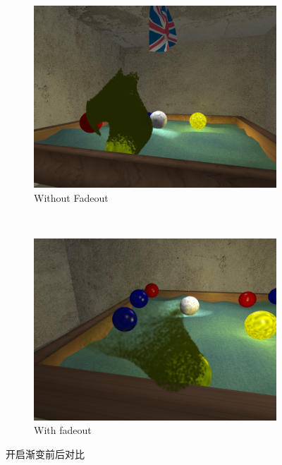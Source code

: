 \documentclass[11pt]{article}
\begin{document}
\begin{figure}[h]
\centering

\begin{subfigure}[b]{0.4\textwidth}
\includegraphics[width=\textwidth]{without-fadeout.png}
\caption{Without Fadeout}
\label{fig:without-fadeout}
\end{subfigure}
~
\begin{subfigure}[b]{0.4\textwidth}
\includegraphics[width=\textwidth]{with-fadeout.png}
\caption{With fadeout}
\label{fig:with-fadeout}
\end{subfigure}

\caption{开启渐变前后对比} \label{fig:fadeout}
\end{figure}
\end{document}
